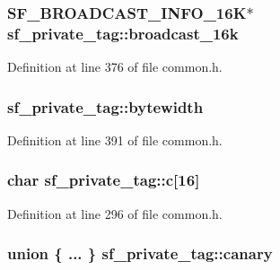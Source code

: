 \subsubsection[{\texorpdfstring{broadcast\+\_\+16k}{broadcast_16k}}]{\setlength{\rightskip}{0pt plus 5cm}S\+F\+\_\+\+B\+R\+O\+A\+D\+C\+A\+S\+T\+\_\+\+I\+N\+F\+O\+\_\+16K$\ast$ sf\+\_\+private\+\_\+tag\+::broadcast\+\_\+16k}\hypertarget{structsf__private__tag_a9fffdb6da27d9a0cb5e6585cbde9d840}{}\label{structsf__private__tag_a9fffdb6da27d9a0cb5e6585cbde9d840}


Definition at line 376 of file common.\+h.

\subsubsection[{\texorpdfstring{bytewidth}{bytewidth}}]{ sf\+\_\+private\+\_\+tag\+::bytewidth}\hypertarget{structsf__private__tag_aed7b77416664bb490620dac7ae612084}{}\label{structsf__private__tag_aed7b77416664bb490620dac7ae612084}


Definition at line 391 of file common.\+h.

\subsubsection[{\texorpdfstring{c}{c}}]{\setlength{\rightskip}{0pt plus 5cm}char sf\+\_\+private\+\_\+tag\+::c\mbox{[}16\mbox{]}}\hypertarget{structsf__private__tag_aca37b34c9215f8c4f934ead50bbd651c}{}\label{structsf__private__tag_aca37b34c9215f8c4f934ead50bbd651c}


Definition at line 296 of file common.\+h.

\subsubsection[{\texorpdfstring{canary}{canary}}]{\setlength{\rightskip}{0pt plus 5cm}union \{ ... \}   sf\+\_\+private\+\_\+tag\+::canary}\hypertarget{structsf__private__tag_af73c81f24b867fd205d826e0cfaacf7c}{}\label{structsf__private__tag_af73c81f24b867fd205d826e0cfaacf7c}
